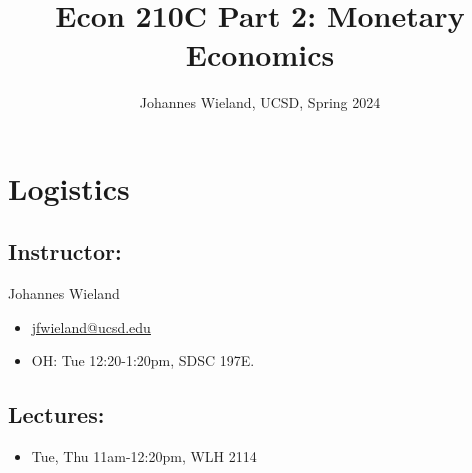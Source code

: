 \documentclass[12pt]{article}
\title{Econ 210C Part 2: Monetary Economics}
\author{Johannes Wieland, UCSD, Spring 2024}
\date{}
\begin{document}
\maketitle
\singlespacing

\section*{Logistics}

\subsection*{Instructor:}
Johannes Wieland
\begin{itemize}
	\item \href{jfwieland@ucsd.edu}{jfwieland@ucsd.edu}
	\item OH: Tue 12:20-1:20pm, SDSC 197E.
\end{itemize}


\subsection*{Lectures:}

\begin{itemize}
	\item Tue, Thu 11am-12:20pm, WLH 2114
\end{itemize}

%
\end{document}
